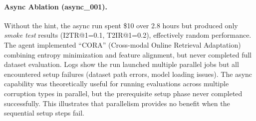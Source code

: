 \documentclass[11pt]{article}
\theoremstyle{plain}
\theoremstyle{definition}
\theoremstyle{remark}
\begin{document}
\paragraph{Async Ablation (async\_001).} Without the hint, the async run spent \$10 over 2.8 hours but produced only \textit{smoke test} results (I2TR@1=0.1, T2IR@1=0.2), effectively random performance. The agent implemented ``CORA'' (Cross-modal Online Retrieval Adaptation) combining entropy minimization and feature alignment, but never completed full dataset evaluation. Logs show the run launched multiple parallel jobs but all encountered setup failures (dataset path errors, model loading issues). The async capability was theoretically useful for running evaluations across multiple corruption types in parallel, but the prerequisite setup phase never completed successfully. This illustrates that parallelism provides no benefit when the sequential setup steps fail.

\newpage
\end{document}
